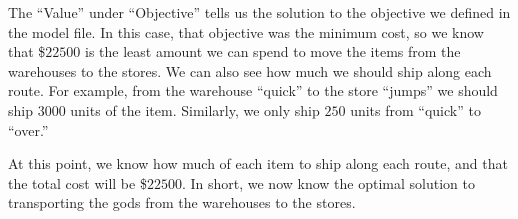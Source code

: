 \documentclass{article}
\begin{document}
The ``Value'' under ``Objective'' tells us the solution to the objective we defined in the model file.  In this case, that objective was the minimum cost, so we know that \$$22500$ is the least amount we can spend to move the items from the warehouses to the stores.  We can also see how much we should ship along each route.  For example, from the warehouse ``quick'' to the store ``jumps'' we should ship $3000$ units of the item.  Similarly, we only ship $250$ units from ``quick'' to ``over.''

At this point, we know how much of each item to ship along each route, and that the total cost will be \$$22500$.  In short, we now know the optimal solution to transporting the gods from the warehouses to the stores.
\end{document}
